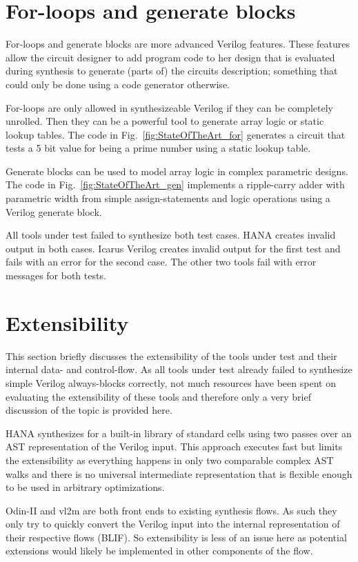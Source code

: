 \section{For-loops and generate blocks}

For-loops and generate blocks are more advanced Verilog features. These features
allow the circuit designer to add program code to her design that is evaluated
during synthesis to generate (parts of) the circuits description; something that
could only be done using a code generator otherwise.

For-loops are only allowed in synthesizeable Verilog if they can be completely
unrolled. Then they can be a powerful tool to generate array logic or static
lookup tables. The code in Fig.~\ref{fig:StateOfTheArt_for} generates a circuit that
tests a 5 bit value for being a prime number using a static lookup table.

Generate blocks can be used to model array logic in complex parametric designs. The
code in Fig.~\ref{fig:StateOfTheArt_gen} implements a ripple-carry adder with
parametric width from simple assign-statements and logic operations using a Verilog
generate block.

All tools under test failed to synthesize both test cases. HANA creates invalid
output in both cases. Icarus Verilog creates invalid output for the first
test and fails with an error for the second case. The other two tools fail with
error messages for both tests.

\section{Extensibility}

This section briefly discusses the extensibility of the tools under test and
their internal data- and control-flow.  As all tools under test already failed
to synthesize simple Verilog always-blocks correctly, not much resources have
been spent on evaluating the extensibility of these tools and therefore only a
very brief discussion of the topic is provided here.

HANA synthesizes for a built-in library of standard cells using two passes over
an AST representation of the Verilog input. This approach executes fast but
limits the extensibility as everything happens in only two comparable complex
AST walks and there is no universal intermediate representation that is flexible
enough to be used in arbitrary optimizations.

Odin-II and vl2m are both front ends to existing synthesis flows. As such they
only try to quickly convert the Verilog input into the internal representation
of their respective flows (BLIF). So extensibility is less of an issue here as
potential extensions would likely be implemented in other components of the
flow.

